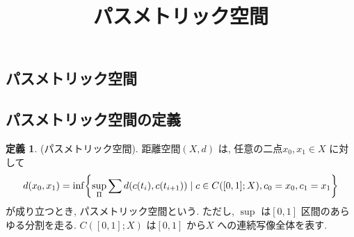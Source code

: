 \documentclass[10pt, fleqn, label-section=none]{bxjsarticle}
\title{パスメトリック空間}
\date{}
\author{}
\theoremstyle{definition}
\newtheorem{dfn}{定義}[section]
\newcommand{\cbra}[1]{\mleft\{#1\mright\}}
\renewcommand{\;}{\, ; \,}
\begin{document}
\maketitle



\section{}

\subsection{パスメトリック空間}




\subsection{パスメトリック空間の定義} 

\begin{dfn}(パスメトリック空間). 距離空間$(X, d)$ は, 任意の二点$x_0, x_1 \in X$ に対して
\begin{align*} d(x_0, x_1) = \inf \cbra{ \sup_{\Pi} \sum d(c(t_i), c(t_{i+1} )  ) \mid c \in C([0,1]; X), c_0 = x_0, c_1 = x_1 }   \end{align*}
が成り立つとき, パスメトリック空間という. ただし, $\sup$ は$[0, 1]$ 区間のあらゆる分割を走る. $C([0,1]; X)$ は$[0,1]$ から$X$ への連続写像全体を表す. 
\end{dfn}
\end{document}
